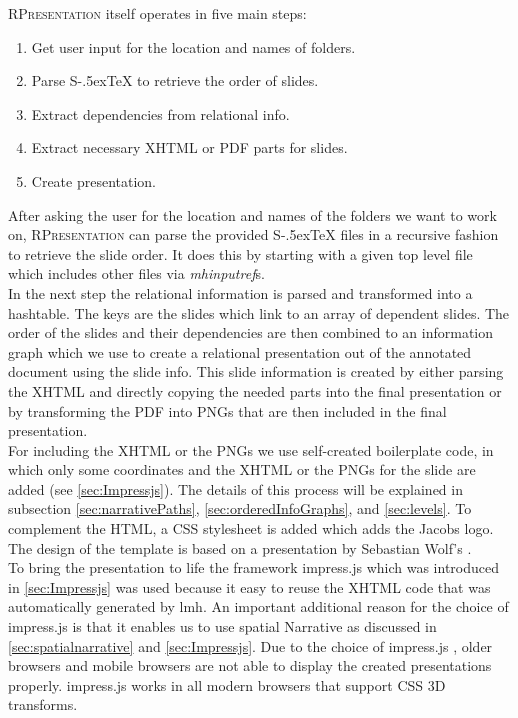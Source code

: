 \documentclass[twoside, 12pt]{article}
\def\stex{\texorpdfstring{\raisebox{-.5ex}S\kern-.5ex\TeX}{sTeX}\xspace}
\def\sTeX{\stex}
\newcommand{\sys}{\textsc{RPresentation}\xspace}
\begin{document}
\sys itself operates in five main steps:\\
\vspace{-12pt}
\begin{enumerate}[topsep=0pt,itemsep=-1ex,partopsep=1ex,parsep=1ex]
\item Get user input for the location and names of folders.
\item Parse \sTeX to retrieve the order of slides.
\item Extract dependencies from relational info.
\item Extract necessary XHTML or PDF parts for slides.
\item Create presentation.
\end{enumerate}
\vspace{5pt}

After asking the user for the location and names of the folders we want to work on, \sys can parse the provided \stex files in a recursive fashion to retrieve the slide order. It does this by starting with a given top level file which includes other files via \textit{mhinputref}s.\\

In the next step the relational information is parsed and transformed into a hashtable. The keys are the slides which link to an array of dependent slides. The order of the slides and their dependencies are then combined to an information graph which we use to create a relational presentation out of the annotated document using the slide info. This slide information is created by either parsing the XHTML and directly copying the needed parts into the final presentation or by transforming the PDF into PNGs that are then included in the final presentation.\\

For including the XHTML or the PNGs we use self-created boilerplate code, in which only some coordinates and the XHTML or the PNGs for the slide are added (see \autoref{sec:Impressjs}). The details of this process will be explained in subsection \ref{sec:narrativePaths}, \ref{sec:orderedInfoGraphs}, and \ref{sec:levels}. To complement the HTML, a CSS stylesheet is added which adds the Jacobs logo. The design of the template is based on a presentation by Sebastian Wolf's \cite{Wolf:npentrel15}.\\

To bring the presentation to life the framework impress.js which was introduced in \autoref{sec:Impressjs} was used because it easy to reuse the XHTML code that was automatically generated by lmh. An important additional reason for the choice of impress.js is that it enables us to use spatial Narrative as discussed in \autoref{sec:spatialnarrative} and \autoref{sec:Impressjs}. Due to the choice of impress.js \cite{JSImpress:npentrel14}, older browsers and mobile browsers are not able to display the created presentations properly. impress.js works in all modern browsers that support CSS 3D transforms.\\
\end{document}
